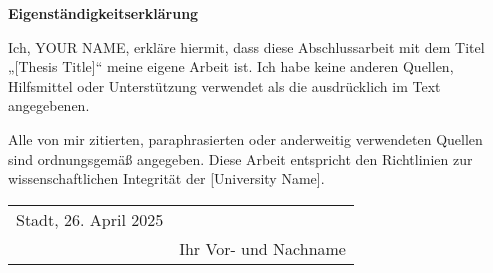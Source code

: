 \begin{center}
    \noindent \large\textbf{Eigenständigkeitserklärung}
\end{center}

\vspace{1cm}
\noindent Ich, YOUR NAME, erkläre hiermit, dass diese Abschlussarbeit mit dem Titel „[Thesis Title]“ meine eigene Arbeit ist. Ich habe keine anderen Quellen, Hilfsmittel oder Unterstützung verwendet als die ausdrücklich im Text angegebenen.\vspace{.3cm}

\noindent Alle von mir zitierten, paraphrasierten oder anderweitig verwendeten Quellen sind ordnungsgemäß angegeben. Diese Arbeit entspricht den Richtlinien zur wissenschaftlichen Integrität der [University Name].

\vspace{35mm}
\begin{tabular}{@{}p{2in}p{3.5in}@{}}
Stadt, 26. April 2025 & \hrulefill\\
& \centering Ihr Vor- und Nachname \\
\end{tabular} 

